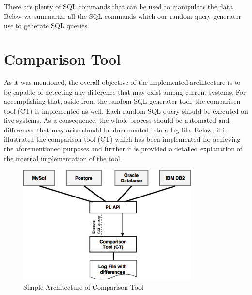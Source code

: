 There are plenty of SQL commands that can be used to manipulate the data. Below we summarize all the SQL commands which our random query generator use to generate SQL queries.   


\section{Comparison Tool} 
As it was mentioned, the overall objective of the implemented architecture is to be capable of detecting  any difference that may exist among current systems. For accomplishing that, aside from the random SQL generator tool,  the comparison tool (CT) is implemented as well. Each random SQL query should be executed on five systems. As a consequence, the whole process should be automated and differences that may arise should be documented into a log file. Below, it is illustrated the comparison tool (CT) which has been implemented for achieving the aforementioned purposes and further it is provided a detailed explanation of the internal implementation of the tool.  


 \begin{figure} 
      \centering
      \includegraphics[width=\textwidth,height=6cm]{Images/Chapter4/2-ComparisonTool}
      \caption{Simple Architecture of Comparison Tool}
      \label{fig:counting-methods}
  \end{figure}

